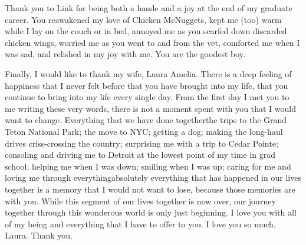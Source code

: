\begin{acknowledge}
Thank you to Link for being both a hassle and a joy at the end of my
graduate career. You reawakened my love of Chicken McNuggets, kept me
(too) warm while I lay on the couch or in bed, annoyed me as you scarfed
down discarded chicken wings, worried me as you went to and from the
vet, comforted me when I was sad, and relished in my joy with me. You
are the goodest boy.

Finally, I would like to thank my wife, Laura Amelia. There is a deep
feeling of happiness that I never felt before that you have brought into
my life, that you continue to bring into my life every single day. From
the first day I met you to me writing these very words, there is not a
moment spent with you that I would want to change. Everything that we
have done together\textemdash{}the trips to the Grand Teton National
Park; the move to NYC; getting a dog; making the long-haul drives
criss-crossing the country; surprising me with a trip to Cedar Pointe;
consoling and driving me to Detroit at the lowest point of my time in
grad school; helping me when I was down; smiling when I was up; caring
for me and loving me through everything\textemdash{}absolutely
everything that has happened in our lives together is a memory that I
would not want to lose, because those memories are with you. While this
segment of our lives together is now over, our journey together through
this wonderous world is only just beginning. I love you with all of my
being and everything that I have to offer to you. I love you so much,
Laura. Thank you.

\end{acknowledge}

